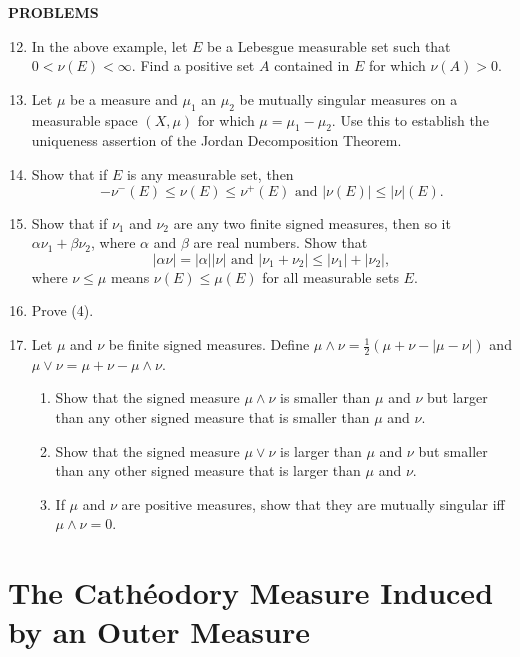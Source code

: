 \begin{center}
	\textbf{PROBLEMS}
\end{center}
\begin{enumerate}
	\setcounter{enumi}{11}
	\item In the above example, let $E$ be a Lebesgue measurable set such that $0<\nu(E)<\infty$.
	Find a positive set $A$ contained in $E$ for which $\nu(A)>0$.
	\item Let $\mu$ be a measure and $\mu_1$ an $\mu_2$ be mutually singular measures on a measurable space $(X,\mu)$ for which $\mu=\mu_1-\mu_2$.
	Use this to establish the uniqueness assertion of the Jordan Decomposition Theorem.
	\item Show that if $E$ is any measurable set, then
	\[
		-\nu^-(E)\le\nu(E)\le\nu^+(E)\text{ and }|\nu(E)|\le|\nu|(E).	
	\]
	\item Show that if $\nu_1$ and $\nu_2$ are any two finite signed measures, then so it $\alpha\nu_1+\beta\nu_2$, where $\alpha$ and $\beta$ are real numbers. Show that
	\[
		|\alpha\nu|=|\alpha||\nu|\text{ and }|\nu_1+\nu_2|\le|\nu_1|+|\nu_2|,
	\]
	where $\nu\le\mu$ means $\nu(E)\le\mu(E)$ for all measurable sets $E$.
	\item Prove (4).
	\item Let $\mu$ and $\nu$ be finite signed measures.
	Define $\mu\land\nu=\frac{1}{2}(\mu+\nu-|\mu-\nu|)$ and $\mu\lor\nu=\mu+\nu-\mu\land\nu$.
	\begin{enumerate}[label=(\roman*),align=left]  
		\item Show that the signed measure $\mu\land\nu$ is smaller than $\mu$ and $\nu$ but larger than any other signed measure that is smaller than $\mu$ and $\nu$.
		\item Show that the signed measure $\mu\lor\nu$ is larger than $\mu$ and $\nu$ but smaller than any other signed measure that is larger than $\mu$ and $\nu$.
		\item If $\mu$ and $\nu$ are positive measures, show that they are mutually singular iff $\mu\land\nu=0$.
	\end{enumerate}
\end{enumerate}

\section{The Cath\'eodory Measure Induced by an Outer Measure}

